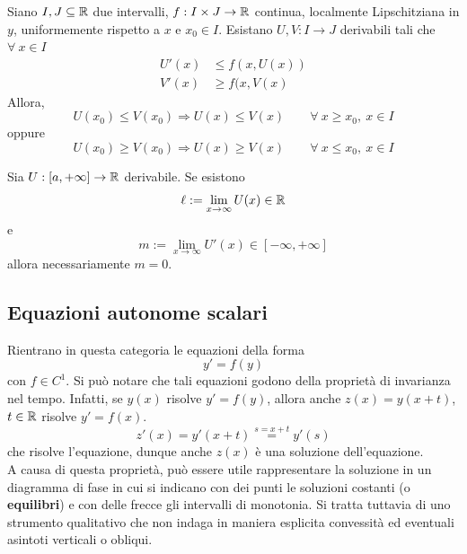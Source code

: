 \begin{theorem}
    Siano $I,J \subseteq \mathbb{R}$ due intervalli, $f:I\times J \to \mathbb{R}$ continua, localmente Lipschitziana in $y$, uniformemente rispetto a $x$ e $x_0 \in I$. Esistano $U,V: I \to J$ derivabili tali che $\forall\ x \in I$
    \begin{equation*}
        \begin{aligned}
            U'(x) &\leq f(x, U(x))\\
            V'(x) & \geq f(x, V(x)
        \end{aligned}
    \end{equation*}
    Allora,
    \begin{equation*}
     U(x_0) \leq V(x_0) \Rightarrow U(x) \leq V(x) \qquad \forall\ x \geq x_0,\ x \in I \end{equation*}
    oppure
    \begin{equation*}
    U(x_0) \geq V(x_0) \Rightarrow U(x) \geq V(x) \qquad \forall\ x \leq x_0,\ x \in I \end{equation*}
\end{theorem}
\begin{theorem}
    Sia $U:[a, +\infty]\to \mathbb{R}$ derivabile. Se esistono
    \begin{equation*}
        \ell:=\lim_{x \to \infty}{U(x)} \in \mathbb{R}
    \end{equation*}
    e 
    \begin{equation*}
        m:=\lim_{x \to \infty}{U'(x)} \in [-\infty, +\infty]
    \end{equation*}
    allora necessariamente $m=0$.
\end{theorem}
\subsection{Equazioni autonome scalari}
Rientrano in questa categoria le equazioni della forma
\begin{equation*}
    y'=f(y)
\end{equation*}
con $f \in C^1$.
Si può notare che tali equazioni godono della proprietà di invarianza nel tempo. Infatti, se $y(x)$ risolve $y'=f(y)$, allora anche $z(x)=y(x+t)$, $t\in \mathbb{R}$ risolve $y'=f(x)$.
\begin{equation*}
    z'(x)=y'(x+t) \overset{s=x+t}{=}y'(s)
\end{equation*}
che risolve l'equazione, dunque anche $z(x)$ è una soluzione dell'equazione.\\
A causa di questa proprietà, può essere utile rappresentare la soluzione in un diagramma di fase in cui si indicano con dei punti le soluzioni costanti (o \textbf{equilibri}) e con delle frecce gli intervalli di monotonia. Si tratta tuttavia di uno strumento qualitativo che non indaga in maniera esplicita convessità ed eventuali asintoti verticali o obliqui.
